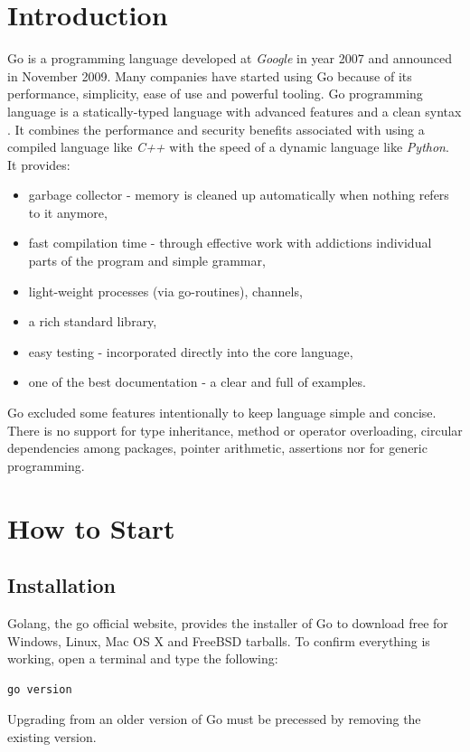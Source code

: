 \documentclass[
  digital, %
  notable,   %
  lof,     %
  lot,     %
]{fithesis3}
\begin{document}
\section{Introduction}
Go is a programming language developed at \textit{Google} in year 2007 and announced in 
November 2009. Many companies have started using Go because of its performance, simplicity, 
ease of use and powerful tooling. Go programming language is a statically-typed language with 
advanced features and a clean syntax \cite{doxsey2016introducing}. It combines the performance 
and security benefits associated with using a compiled language like \textit{C++} with the 
speed of a dynamic language like \textit{Python}. It provides:
\vskip0.1in
\begin{itemize}[leftmargin=2em,rightmargin=1em,itemsep=0.75\parskip,parsep=0em,topsep=0em,partopsep=0em]
\item garbage collector - memory is cleaned up automatically when nothing refers to it 
anymore,
\item fast compilation time - through effective work with addictions individual parts of the 
program and simple grammar,
\item light-weight processes (via go-routines), channels,
\item a rich standard library,
\item easy testing - incorporated directly into the core language,
\item one of the best documentation - a clear and full of examples.
\end{itemize}
\vskip0.1in

Go excluded some features intentionally to keep language simple and concise. There is no 
support for type inheritance, method or operator overloading, circular dependencies among 
packages, pointer arithmetic, assertions nor for generic programming.

\section{How to Start}
\subsection{Installation}
Golang, the go official website, provides the installer of Go to download free for Windows, 
Linux, Mac OS X and FreeBSD tarballs. To confirm everything is working, open a terminal and 
type the following:
\begin{lstlisting}
go version
\end{lstlisting}
Upgrading from an older version of Go must be precessed by removing the existing version. 
\end{document}
